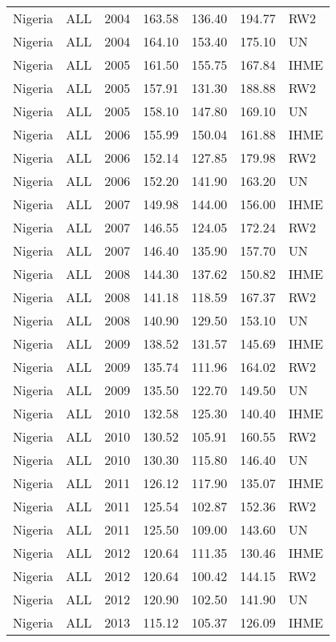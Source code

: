 \begin{longtable}{lllrrrl}
  Nigeria & ALL & 2004 & 163.58 & 136.40 & 194.77 & RW2 \\ 
  Nigeria & ALL & 2004 & 164.10 & 153.40 & 175.10 & UN \\ 
  Nigeria & ALL & 2005 & 161.50 & 155.75 & 167.84 & IHME \\ 
  Nigeria & ALL & 2005 & 157.91 & 131.30 & 188.88 & RW2 \\ 
  Nigeria & ALL & 2005 & 158.10 & 147.80 & 169.10 & UN \\ 
  Nigeria & ALL & 2006 & 155.99 & 150.04 & 161.88 & IHME \\ 
  Nigeria & ALL & 2006 & 152.14 & 127.85 & 179.98 & RW2 \\ 
  Nigeria & ALL & 2006 & 152.20 & 141.90 & 163.20 & UN \\ 
  Nigeria & ALL & 2007 & 149.98 & 144.00 & 156.00 & IHME \\ 
  Nigeria & ALL & 2007 & 146.55 & 124.05 & 172.24 & RW2 \\ 
  Nigeria & ALL & 2007 & 146.40 & 135.90 & 157.70 & UN \\ 
  Nigeria & ALL & 2008 & 144.30 & 137.62 & 150.82 & IHME \\ 
  Nigeria & ALL & 2008 & 141.18 & 118.59 & 167.37 & RW2 \\ 
  Nigeria & ALL & 2008 & 140.90 & 129.50 & 153.10 & UN \\ 
  Nigeria & ALL & 2009 & 138.52 & 131.57 & 145.69 & IHME \\ 
  Nigeria & ALL & 2009 & 135.74 & 111.96 & 164.02 & RW2 \\ 
  Nigeria & ALL & 2009 & 135.50 & 122.70 & 149.50 & UN \\ 
  Nigeria & ALL & 2010 & 132.58 & 125.30 & 140.40 & IHME \\ 
  Nigeria & ALL & 2010 & 130.52 & 105.91 & 160.55 & RW2 \\ 
  Nigeria & ALL & 2010 & 130.30 & 115.80 & 146.40 & UN \\ 
  Nigeria & ALL & 2011 & 126.12 & 117.90 & 135.07 & IHME \\ 
  Nigeria & ALL & 2011 & 125.54 & 102.87 & 152.36 & RW2 \\ 
  Nigeria & ALL & 2011 & 125.50 & 109.00 & 143.60 & UN \\ 
  Nigeria & ALL & 2012 & 120.64 & 111.35 & 130.46 & IHME \\ 
  Nigeria & ALL & 2012 & 120.64 & 100.42 & 144.15 & RW2 \\ 
  Nigeria & ALL & 2012 & 120.90 & 102.50 & 141.90 & UN \\ 
  Nigeria & ALL & 2013 & 115.12 & 105.37 & 126.09 & IHME \\ 

\end{longtable}
